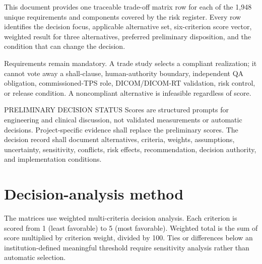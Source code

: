 \documentclass[11pt,letterpaper]{article}
\begin{document}

This document provides one traceable trade-off matrix row for each of the 1,948 unique requirements and components covered by the risk register. Every row identifies the decision focus, applicable alternative set, six-criterion score vector, weighted result for three alternatives, preferred preliminary disposition, and the condition that can change the decision.

Requirements remain mandatory. A trade study selects a compliant realization; it cannot vote away a shall-clause, human-authority boundary, independent QA obligation, commissioned-TPS role, DICOM/DICOM-RT validation, risk control, or release condition. A noncompliant alternative is infeasible regardless of score.

\begin{nlnotice}{PRELIMINARY DECISION STATUS}
Scores are structured prompts for engineering and clinical discussion, not validated measurements or automatic decisions. Project-specific evidence shall replace the preliminary scores. The decision record shall document alternatives, criteria, weights, assumptions, uncertainty, sensitivity, conflicts, risk effects, recommendation, decision authority, and implementation conditions.
\end{nlnotice}

\section{Decision-analysis method}

The matrices use weighted multi-criteria decision analysis. Each criterion is scored from 1 (least favorable) to 5 (most favorable). Weighted total is the sum of score multiplied by criterion weight, divided by 100. Ties or differences below an institution-defined meaningful threshold require sensitivity analysis rather than automatic selection.
\end{document}
